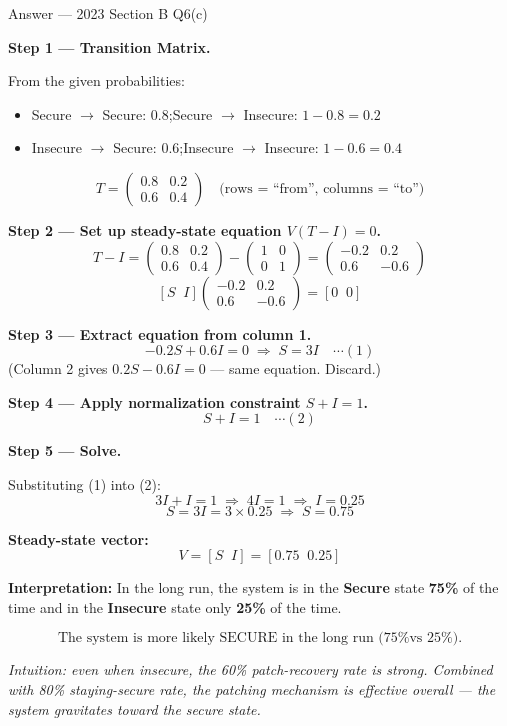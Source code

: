 \documentclass[12pt,a4paper]{article}
\begin{document}
\begin{solbox}{Answer --- 2023 Section B Q6(c)}

\textbf{Step 1 --- Transition Matrix.}

From the given probabilities:
\begin{itemize}[noitemsep]
  \item Secure $\to$ Secure: $0.8$;\quad Secure $\to$ Insecure: $1 - 0.8 = 0.2$
  \item Insecure $\to$ Secure: $0.6$;\quad Insecure $\to$ Insecure: $1 - 0.6 = 0.4$
\end{itemize}
\[
T = \begin{pmatrix} 0.8 & 0.2 \\ 0.6 & 0.4 \end{pmatrix}
\quad\text{(rows = ``from'', columns = ``to'')}
\]

\textbf{Step 2 --- Set up steady-state equation $V(T - I) = 0$.}
\[
T - I = \begin{pmatrix} 0.8 & 0.2 \\ 0.6 & 0.4 \end{pmatrix} - \begin{pmatrix} 1 & 0 \\ 0 & 1 \end{pmatrix} = \begin{pmatrix} -0.2 & 0.2 \\ 0.6 & -0.6 \end{pmatrix}
\]
\[
[S \;\; I]\begin{pmatrix} -0.2 & 0.2 \\ 0.6 & -0.6 \end{pmatrix} = [0 \;\; 0]
\]

\textbf{Step 3 --- Extract equation from column 1.}
\[
-0.2S + 0.6I = 0 \;\Rightarrow\; S = 3I \quad \cdots (1)
\]
(Column 2 gives $0.2S - 0.6I = 0$ --- same equation. Discard.)

\textbf{Step 4 --- Apply normalization constraint $S + I = 1$.}
\[
S + I = 1 \quad \cdots (2)
\]

\textbf{Step 5 --- Solve.}

Substituting (1) into (2):
\[
3I + I = 1 \;\Rightarrow\; 4I = 1 \;\Rightarrow\; \boxed{I = 0.25}
\]
\[
S = 3I = 3 \times 0.25 \;\Rightarrow\; \boxed{S = 0.75}
\]

\textbf{Steady-state vector:}
\[
V = [S \;\; I] = [0.75 \;\; 0.25]
\]

\textbf{Interpretation:} In the long run, the system is in the \textbf{Secure} state \textbf{75\%} of the time and in the \textbf{Insecure} state only \textbf{25\%} of the time.

\[
\boxed{\text{The system is more likely SECURE in the long run (75\% vs 25\%).}}
\]

\textit{Intuition: even when insecure, the 60\% patch-recovery rate is strong. Combined with 80\% staying-secure rate, the patching mechanism is effective overall --- the system gravitates toward the secure state.}
\end{solbox}
\end{document}
